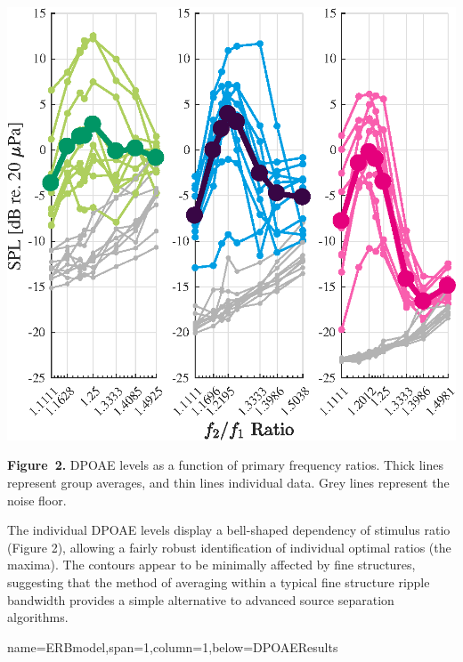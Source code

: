 \documentclass[paperwidth=100cm,paperheight=160cm,portrait,fontscale=0.2941]{baposter}
\begin{document}
\begin{poster}
{\begin{flushright}
\includegraphics[width=0.95\linewidth]{pos_all_OAE.eps}
\end{flushright}
\vspace{-10pt}       

\textbf{Figure~2. }DPOAE levels as a function of primary frequency ratios. Thick lines represent group averages, and thin lines individual data. Grey lines represent the noise floor.


The individual DPOAE levels display a bell-shaped dependency of stimulus ratio (Figure 2), allowing a fairly robust identification of individual optimal ratios (the maxima). The contours appear to be minimally affected by fine structures, suggesting that the method of averaging within a typical fine structure ripple bandwidth provides a simple alternative to advanced source separation algorithms.

} 

{name=ERBmodel,span=1,column=1,below=DPOAEResults}
{\parskip 5pt

~

}
\end{poster}
\end{document}
